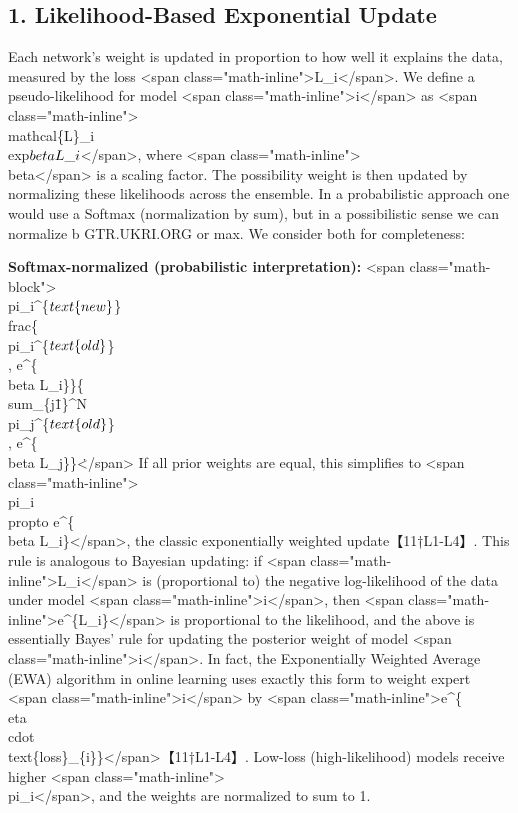 \documentclass{article}
\begin{document}
\subsection*{1. Likelihood-Based Exponential Update}
Each network’s weight is updated in proportion to how well it explains the data, measured by the loss <span class="math-inline">L\_i</span>. We define a pseudo-likelihood for model <span class="math-inline">i</span> as <span class="math-inline">\\mathcal\{L\}\_i \= \\exp\(\-\\beta L\_i\)</span>, where <span class="math-inline">\\beta{}</span> is a scaling factor. The possibility weight is then updated by normalizing these likelihoods across the ensemble. In a probabilistic approach one would use a Softmax (normalization by sum), but in a possibilistic sense we can normalize b​
GTR.UKRI.ORG
 or max. We consider both for completeness:

\textbf{Softmax-normalized (probabilistic interpretation):}
<span class="math-block">\\pi\_i^\{\(\\text\{new\}\)\} \= \\frac\{\\pi\_i^\{\(\\text\{old\}\)\} \\, e^\{\-\\beta L\_i\}\}\{\\sum\_\{j\=1\}^N \\pi\_j^\{\(\\text\{old\}\)\} \\, e^\{\-\\beta L\_j\}\}\.</span>
If all prior weights are equal, this simplifies to <span class="math-inline">\\pi\_i \\propto e^\{\-\\beta L\_i\}</span>, the classic exponentially weighted update【11†L1-L4】. This rule is analogous to Bayesian updating: if <span class="math-inline">L\_i</span> is (proportional to) the negative log-likelihood of the data under model <span class="math-inline">i</span>, then <span class="math-inline">e^\{\-L\_i\}</span> is proportional to the likelihood, and the above is essentially Bayes’ rule for updating the posterior weight of model <span class="math-inline">i</span>. In fact, the Exponentially Weighted Average (EWA) algorithm in online learning uses exactly this form to weight expert <span class="math-inline">i</span> by <span class="math-inline">e^\{\-\\eta \\cdot \\text\{loss\}\_\{i\}\}</span>【11†L1-L4】. Low-loss (high-likelihood) models receive higher <span class="math-inline">\\pi\_i</span>, and the weights are normalized to sum to 1.
\end{document}
